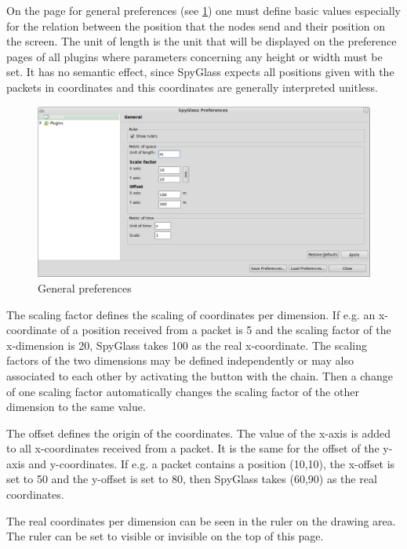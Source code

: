 On the page for general preferences (see \ref{pic:generalpreferences}) one must define basic values especially for the
relation between the position that
the nodes send and their position on the screen. The unit of length is the unit that will be displayed on the
preference pages of all plugins where parameters concerning any height or width must be set. It has no semantic effect, since
SpyGlass expects all positions given with the packets in coordinates and this coordinates are generally interpreted unitless.

\begin{figure}[htb]
  \begin{center}
    \includegraphics[width=13.2cm]{./pics/general_prefpage}
    \caption{General preferences}
    \label{pic:generalpreferences}
  \end{center}
\end{figure}

The scaling factor defines the scaling of coordinates per dimension. If e.g. an x-coordinate of a position received from
a packet is 5 and the scaling factor of the x-dimension is 20, SpyGlass takes 100 as the real x-coordinate. The scaling
factors of the two dimensions may be defined independently or may also associated to each other by activating the button
with the chain. Then a change of one scaling factor automatically changes the scaling factor of the other dimension to the
same value.

The offset defines the origin of the coordinates. The value of the x-axis is added to all x-coordinates received from a packet.
It is the same for the offset of the y-axis and y-coordinates. If e.g. a packet contains a position (10,10), the x-offset is
set to 50 and the y-offset is set to 80, then SpyGlass takes (60,90) as the real coordinates.

The real coordinates per dimension can be seen in the ruler on the drawing area. The ruler can be set to visible or invisible
on the top of this page.

